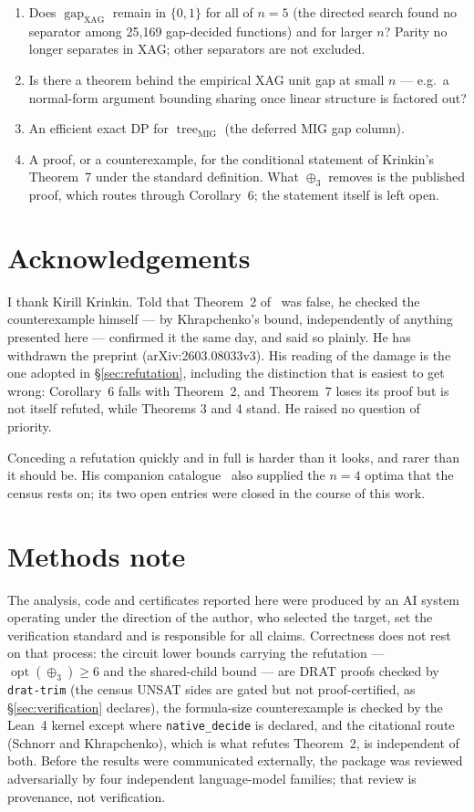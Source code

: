 \documentclass[11pt]{article}
\DeclareMathOperator{\opt}{opt}
\DeclareMathOperator{\tree}{tree}
\DeclareMathOperator{\gapop}{gap}
\newcommand{\gapx}{\gapop_{\mathrm{XAG}}}
\newcommand{\treemig}{\tree_{\mathrm{MIG}}}
\theoremstyle{plain}
\begin{document}
\begin{enumerate}
  \item Does $\gapx$ remain in $\{0,1\}$ for all of $n = 5$ (the directed search found no
  separator among 25{,}169 gap-decided functions) and for larger $n$? Parity no longer separates in
  XAG; other separators are not excluded.
  \item Is there a theorem behind the empirical XAG unit gap at small $n$ --- e.g.\ a normal-form
  argument bounding sharing once linear structure is factored out?
  \item An efficient exact DP for $\treemig$ (the deferred MIG gap column).
  \item A proof, or a counterexample, for the conditional statement of Krinkin's Theorem~7 under
  the standard definition. What $\oplus_3$ removes is the published proof, which routes through
  Corollary~6; the statement itself is left open.
\end{enumerate}

\section*{Acknowledgements}
I thank Kirill Krinkin. Told that Theorem~2 of~\cite{krinkin-unitgap} was false, he checked the
counterexample himself --- by Khrapchenko's bound, independently of anything presented here ---
confirmed it the same day, and said so plainly. He has withdrawn the preprint (arXiv:2603.08033v3).
His reading of the damage is the one adopted in \S\ref{sec:refutation}, including the distinction
that is easiest to get wrong: Corollary~6 falls with Theorem~2, and Theorem~7 loses its proof but
is not itself refuted, while Theorems 3 and 4 stand. He raised no question of priority.

Conceding a refutation quickly and in full is harder than it looks, and rarer than it should be.
His companion catalogue~\cite{krinkin-catalog} also supplied the $n = 4$ optima that the census
rests on; its two open entries were closed in the course of this work.

\section*{Methods note}
The analysis, code and certificates reported here were produced by an AI system operating under
the direction of the author, who selected the target, set the verification standard and is
responsible for all claims. Correctness does not rest on that process: the circuit lower bounds
carrying the refutation --- $\opt(\oplus_3) \ge 6$ and the shared-child bound --- are DRAT proofs
checked by \texttt{drat-trim} (the census UNSAT sides are gated but not proof-certified, as
\S\ref{sec:verification} declares), the formula-size counterexample is checked by the
Lean~4 kernel except where \texttt{native\_decide} is declared, and the citational route
(Schnorr and Khrapchenko), which is what refutes Theorem~2, is independent of both. Before the results were communicated externally, the package
was reviewed adversarially by four independent language-model families; that review is provenance,
not verification.
\end{document}
